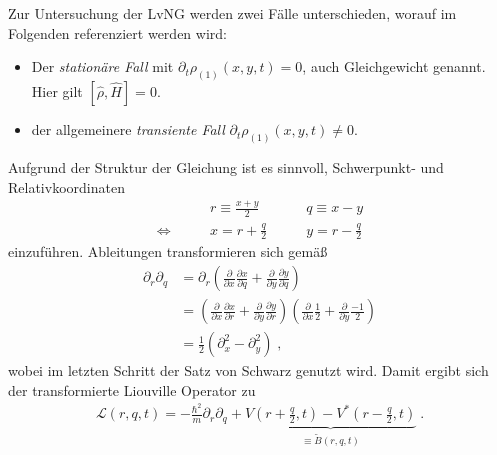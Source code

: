 Zur Untersuchung der LvNG werden zwei Fälle unterschieden, worauf im Folgenden referenziert werden wird:
\begin{itemize}
  \item Der \emph{stationäre Fall} mit $\partial_t \rho_{(1)}(x,y,t) = 0$, auch Gleichgewicht genannt. Hier gilt $\left[\hat{\rho} , \hat{H}\right]=0$.
  \item der allgemeinere \emph{transiente Fall} $\partial_t \rho_{(1)}(x,y,t) \neq 0$.
\end{itemize}
Aufgrund der Struktur der Gleichung ist es sinnvoll, Schwerpunkt- und Relativkoordinaten
\begin{equation}
  \begin{aligned}
    &r \equiv \frac{x+y}{2} \qquad &q \equiv x-y \\
    \Leftrightarrow\qquad &x = r+\frac{q}{2} \qquad &y = r-\frac{q}{2}
  \end{aligned}
  \label{eq:gedrehteKoordinaten}
\end{equation}
einzuführen. Ableitungen transformieren sich gemäß
\begin{equation*}
  \begin{aligned}
    \partial_r \partial_q  &= \partial_r \left( \frac{\partial}{\partial x} \frac{\partial x}{\partial q} + \frac{\partial}{\partial y} \frac{\partial y}{\partial q}\right) \\
     &= \left( \frac{\partial}{\partial x} \frac{\partial x}{\partial r} + \frac{\partial}{\partial y} \frac{\partial y}{\partial r}\right) \left( \frac{\partial}{\partial x} \frac{1}{2} + \frac{\partial}{\partial y} \frac{-1}{2}\right)\\
    &=  \frac{1}{2}(\partial_x^2 - \partial_y^2) \; ,
  \end{aligned}
\end{equation*}
wobei im letzten Schritt der Satz von Schwarz genutzt wird. Damit ergibt sich der transformierte Liouville Operator zu
\begin{align*}
  \mathcal{L}(r,q,t) = -\frac{\hbar^2}{m} \partial_r\partial_q + \underbrace{V\left(r+\frac{q}{2},t\right) - V^*\left(r-\frac{q}{2},t\right)}_{\equiv \tilde{B}(r,q,t)} \; .
\end{align*}
